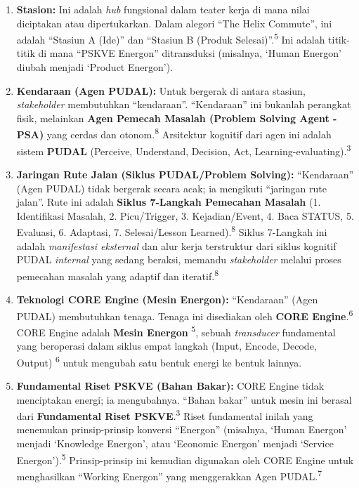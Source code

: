 \documentclass[
  letterpaper,
  DIV=11,
  numbers=noendperiod]{scrreprt}
\begin{document}
\begin{enumerate}
\def\labelenumi{\arabic{enumi}.}
\item
  \textbf{Stasion:} Ini adalah \emph{hub} fungsional dalam teater kerja
  di mana nilai diciptakan atau dipertukarkan. Dalam alegori ``The Helix
  Commute'', ini adalah ``Stasiun A (Ide)'' dan ``Stasiun B (Produk
  Selesai)''.\textsuperscript{5} Ini adalah titik-titik di mana ``PSKVE
  Energon'' ditransduksi (misalnya, `Human Energon' diubah menjadi
  `Product Energon').
\item
  \textbf{Kendaraan (Agen PUDAL):} Untuk bergerak di antara stasiun,
  \emph{stakeholder} membutuhkan ``kendaraan''. ``Kendaraan'' ini
  bukanlah perangkat fisik, melainkan \textbf{Agen Pemecah Masalah
  (Problem Solving Agent - PSA)} yang cerdas dan
  otonom.\textsuperscript{8} Arsitektur kognitif dari agen ini adalah
  sistem \textbf{PUDAL} (Perceive, Understand, Decision, Act,
  Learning-evaluating).\textsuperscript{3}
\item
  \textbf{Jaringan Rute Jalan (Siklus PUDAL/Problem Solving):}
  ``Kendaraan'' (Agen PUDAL) tidak bergerak secara acak; ia mengikuti
  ``jaringan rute jalan''. Rute ini adalah \textbf{Siklus 7-Langkah
  Pemecahan Masalah} (1. Identifikasi Masalah, 2. Picu/Trigger, 3.
  Kejadian/Event, 4. Baca STATUS, 5. Evaluasi, 6. Adaptasi, 7.
  Selesai/Lesson Learned).\textsuperscript{8} Siklus 7-Langkah ini
  adalah \emph{manifestasi eksternal} dan alur kerja terstruktur dari
  siklus kognitif PUDAL \emph{internal} yang sedang beraksi, memandu
  \emph{stakeholder} melalui proses pemecahan masalah yang adaptif dan
  iteratif.\textsuperscript{8}
\item
  \textbf{Teknologi CORE Engine (Mesin Energon):} ``Kendaraan'' (Agen
  PUDAL) membutuhkan tenaga. Tenaga ini disediakan oleh \textbf{CORE
  Engine}.\textsuperscript{6} CORE Engine adalah \textbf{Mesin Energon}
  \textsuperscript{5}, sebuah \emph{transducer} fundamental yang
  beroperasi dalam siklus empat langkah (Input, Encode, Decode, Output)
  \textsuperscript{6} untuk mengubah satu bentuk energi ke bentuk
  lainnya.
\item
  \textbf{Fundamental Riset PSKVE (Bahan Bakar):} CORE Engine tidak
  menciptakan energi; ia mengubahnya. ``Bahan bakar'' untuk mesin ini
  berasal dari \textbf{Fundamental Riset PSKVE}.\textsuperscript{3}
  Riset fundamental inilah yang menemukan prinsip-prinsip konversi
  ``Energon'' (misalnya, `Human Energon' menjadi `Knowledge Energon',
  atau `Economic Energon' menjadi `Service Energon').\textsuperscript{5}
  Prinsip-prinsip ini kemudian digunakan oleh CORE Engine untuk
  menghasilkan ``Working Energon'' yang menggerakkan Agen
  PUDAL.\textsuperscript{7}
\end{enumerate}
\end{document}
